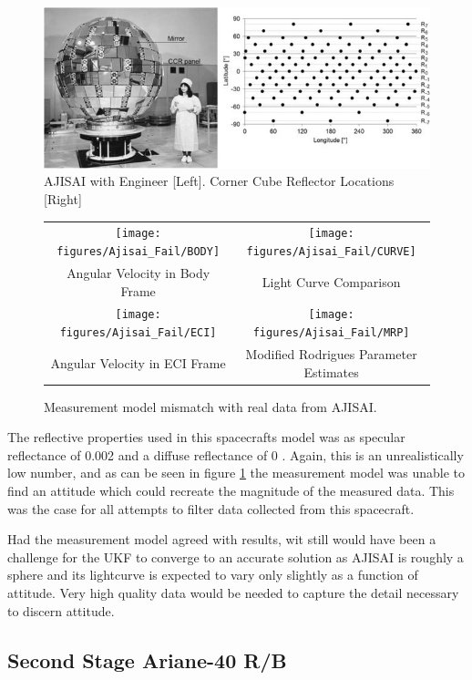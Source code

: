 \begin{figure}
	\centering
	\includegraphics[width = 150mm]{figures/ajisai_panels.jpg}
	\caption{AJISAI with Engineer [Left]. Corner Cube Reflector Locations [Right] \cite{ajisai}}
\end{figure}

\begin{figure}[!ht]\label{ajisa_fail}
	\begin{tabular}{cc}
		\texttt{[image: figures/Ajisai\_Fail/BODY]} &
		\texttt{[image: figures/Ajisai\_Fail/CURVE]} \\
		Angular Velocity in Body Frame & Light Curve Comparison \\
		\texttt{[image: figures/Ajisai\_Fail/ECI]} &
		\texttt{[image: figures/Ajisai\_Fail/MRP]} \\
		Angular Velocity in ECI Frame & Modified Rodrigues Parameter Estimates
	\end{tabular}
	\caption{Measurement model mismatch with real data from AJISAI.}
\end{figure}

The reflective properties used in this spacecrafts model was as specular reflectance of 0.002 and a diffuse reflectance of 0 . Again, this is an unrealistically low number, and as can be seen in figure \ref{ajisa_fail} the measurement model was unable to find an attitude which could recreate the magnitude of the measured data. This was the case for all attempts to filter data collected from this spacecraft.

Had the measurement model agreed with results, wit still would have been a challenge for the UKF to converge to an accurate solution as AJISAI is roughly a sphere and its lightcurve is expected to vary only slightly as a function of attitude. Very high quality data would be needed to capture the detail necessary to discern attitude.

\subsection{Second Stage Ariane-40 R/B}

